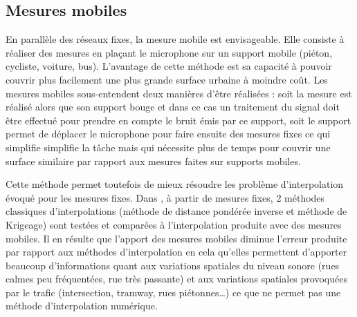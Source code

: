 \subsection{Mesures mobiles}
En parallèle des réseaux fixes, la mesure mobile est envisageable. Elle consiste à réaliser des mesures en plaçant le microphone sur un support mobile (piéton, cycliste, voiture, bus). L'avantage de cette méthode est sa capacité à pouvoir couvrir plus facilement une plus grande surface urbaine à moindre coût. Les mesures mobiles sous-entendent deux manières d'être réalisées : soit la mesure est réalisé alors que son support bouge \cite{alsina-pages_design_2016} et dans ce cas un traitement du signal doit être effectué pour prendre en compte le bruit émis par ce support, soit le support permet de déplacer le microphone pour faire ensuite des mesures fixes \cite{manvell_sadman_2004} ce qui simplifie simplifie la tâche mais qui nécessite plus de temps pour couvrir une surface similaire par rapport aux mesures faites sur supports mobiles. 

Cette méthode permet toutefois de mieux résoudre les problème d'interpolation évoqué pour les mesures fixes. Dans \cite{can_measurement_2014}, à partir de mesures fixes, 2 méthodes classiques d'interpolations (méthode de distance pondérée inverse et méthode de Krigeage) sont testées et comparées à l'interpolation produite avec des mesures mobiles. Il en résulte que l'apport des mesures mobiles diminue l'erreur produite par rapport aux méthodes d'interpolation en cela qu'elles permettent d'apporter beaucoup d'informations quant aux variations spatiales du niveau sonore (rues calmes peu fréquentées, rue très passante) et aux variations spatiales provoquées par le trafic (intersection, tramway, rues piétonnes\dots) ce que ne permet pas une méthode d'interpolation numérique.

